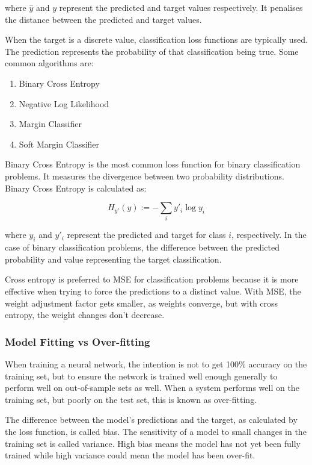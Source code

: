where $\hat{y}$ and $y$ represent the predicted and target values respectively. It penalises the distance between the predicted and target values.

When the target is a discrete value, classification loss functions are typically used\cite{Goodfellow_deeplearning}. The prediction represents the probability of that classification being true. Some common algorithms are:

\begin{enumerate}
    \item Binary Cross Entropy 
    \item Negative Log Likelihood
    \item Margin Classifier
    \item Soft Margin Classifier
\end{enumerate}

Binary Cross Entropy is the most common loss function for binary classification problems. It measures the divergence between two probability distributions. Binary Cross Entropy is calculated as:

\begin{equation}
    H_{{y}'}(y):=-\sum_{i}{y}'_i\log{y_i}
\end{equation}

where $y_i$ and ${y}'_i$ represent the predicted and target for class $i$, respectively. In the case of binary classification problems, the difference between the predicted probability and value representing the target classification.

Cross entropy is preferred to MSE for classification problems because it is more effective when trying to force the predictions to a distinct value\cite{Caudill_nn_primer}. With MSE, the weight adjustment factor gets smaller, as weights converge, but with cross entropy, the weight changes don't decrease.

\subsubsection{Model Fitting vs Over-fitting } \label{subsubsec:fitting}

When training a neural network, the intention is not to get 100\% accuracy on the training set, but to ensure the network is trained well enough generally to perform well on out-of-sample sets as well\cite{intro_ml}. When a system performs well on the training set, but poorly on the test set, this is known as over-fitting.

The difference between the model's predictions and the target, as calculated by the loss function, is called bias. The sensitivity of a model to small changes in the training set is called variance. High bias means the model has not yet been fully trained while high variance could mean the model has been over-fit.

